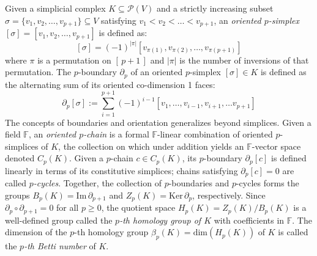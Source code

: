 \\
\\
Given a simplicial complex $K \subseteq \mathcal{P}(V)$ and a strictly increasing subset $\sigma = \{v_1, v_2, \dots, v_{p+1}\} \subseteq V$ satisfying $v_1 < v_2 < \dots < v_{p+1}$, an \emph{oriented $p$-simplex} $[\sigma] = [v_1, v_2, \dots, v_{p+1}]$ is defined as: 
\begin{equation}\label{eq:oriented_simplex}
	[\sigma] = (-1)^{\lvert \pi \rvert } \left [v_{\pi(1)}, v_{\pi(2)}, \dots, v_{\pi(p+1)} \right ]
\end{equation}
where $\pi$ is a permutation on $[\,p+1\,]$ and $\lvert \pi \rvert$ is the number of inversions of that permutation. The $p$-boundary $\partial_p$ of an oriented $p$-simplex $[\sigma] \in K$ is defined as the alternating sum of its oriented co-dimension 1 faces:
\begin{equation}\label{eq:alt_sum}
	\partial_p[\sigma] := \sum_{i=1}^{p+1} (-1)^{i-1} [v_1, \dots, v_{i-1}, v_{i+1}, \dots v_{p+1}]
\end{equation}
The concepts of boundaries and orientation generalizes beyond simplices. Given a field $\mathbb{F}$, an \emph{oriented $p$-chain} is a formal $\mathbb{F}$-linear combination of oriented $p$-simplices of $K$, the collection on which under addition yields an $\mathbb{F}$-vector space denoted $C_p(K)$.
Given a $p$-chain $c \in C_p(K)$, its $p$-boundary $\partial_p[c]$ is defined linearly in terms of its constitutive simplices; chains satisfying $\partial_p[c] = 0$ are called \emph{$p$-cycles}.
 Together, the collection of $p$-boundaries and $p$-cycles forms the groups $B_p(K) = \mathrm{Im}\,\partial_{p+1}$ and $Z_p(K) = \mathrm{Ker}\,\partial_p$, respectively. Since $\partial_p \circ \partial_{p+1} = 0$ for all $p\geq 0$, the quotient space $H_p(K) = Z_p(K) / B_{p}(K)$ is a well-defined group called the \emph{$p$-th homology group of $K$} with coefficients in $\mathbb{F}$. The dimension of the $p$-th homology group $\beta_p(K) = \mathrm{dim}(H_p(K))$ of $K$ is called the \emph{$p$-th Betti number} of $K$. 

